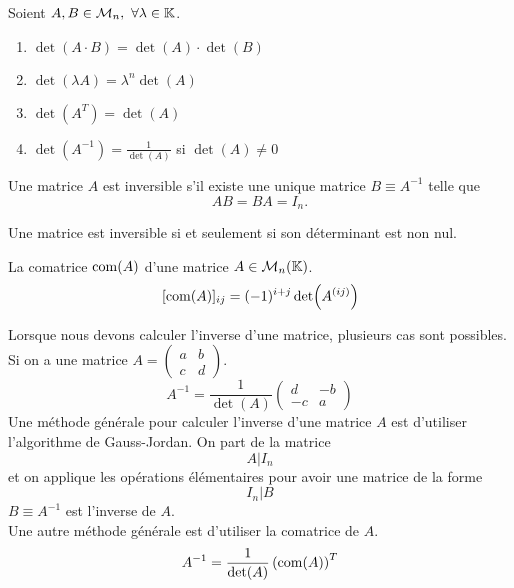 \begin{proposition}
	Soient $A, B \in \mathcal{M}_n,\ \forall \lambda \in \mathbb{K}$.
	\begin{multicols}{2}
	    \begin{enumerate}
		\item $\det(A \cdot B) = \det(A) \cdot \det(B)$
		\item $\det(\lambda A) = \lambda^n \det(A)$
		\item $\det(A^T) = \det(A)$
		\item $\det(A^{-1}) = \frac{1}{\det(A)}$ si $\det(A) \neq 0$
	\end{enumerate}
	\end{multicols}
\end{proposition}

\begin{definition}
	Une matrice $A$ est inversible s'il existe une unique matrice $B \equiv A^{-1}$ telle que 
	\[AB = BA = I_n.\]
\end{definition}

\begin{proposition}
	Une matrice est inversible si et seulement si son déterminant est non nul.
\end{proposition}

\begin{definition}[Comatrice]
	La comatrice $\operatorname{com}(A)$ d'une matrice $A \in \mathcal{M}_n(\mathbb{K})$.
	$$
	[\operatorname{com}(A)]_{ij} = (-1)^{i + j} \det(A^{(ij)}) 
	$$
\end{definition}

\begin{proposition}
    Lorsque nous devons calculer l'inverse d'une matrice, plusieurs cas sont possibles.
    Si on a une matrice
    $A =
    \begin{pmatrix}
        a & b \\
        c & d
    \end{pmatrix}
    $.
    \[
    A^{-1} = \frac{1}{\det(A)} 
    \begin{pmatrix}
        d & -b \\
        -c & a
    \end{pmatrix}
    \]
    Une méthode générale pour calculer l'inverse d'une matrice $A$ est d'utiliser l'algorithme de Gauss-Jordan.
    On part de la matrice 
    \[ A|I_n \]
    et on applique les opérations élémentaires pour avoir une matrice de la forme
    \[I_n|B\]
    $B \equiv A^{-1}$ est l'inverse de $A$.
    \\
    Une autre méthode générale est d'utiliser la comatrice de $A$.
    \[ A^{-1} = \frac{1}{\det(A)} \left( \operatorname{com}(A) \right)^T \]
\end{proposition}


